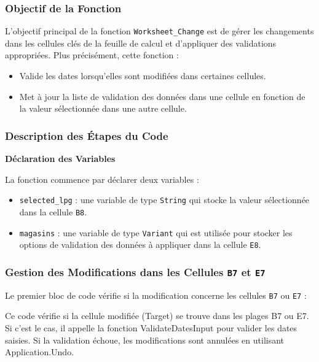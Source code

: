 \documentclass[a4paper, oneside, 12pt, final]{extreport}
\begin{document}
\subsubsection{Objectif de la Fonction}

L'objectif principal de la fonction \texttt{Worksheet\_Change} est de gérer les changements dans les cellules clés de la feuille de calcul et d'appliquer des validations appropriées. Plus précisément, cette fonction :

\begin{itemize}
    \item Valide les dates lorsqu'elles sont modifiées dans certaines cellules.
    \item Met à jour la liste de validation des données dans une cellule en fonction de la valeur sélectionnée dans une autre cellule.
\end{itemize}

\subsubsection{Description des Étapes du Code}

\textbf{Déclaration des Variables}

La fonction commence par déclarer deux variables :

\begin{itemize}
    \item \texttt{selected\_lpg} : une variable de type \texttt{String} qui stocke la valeur sélectionnée dans la cellule \texttt{B8}.
    \item \texttt{magasins} : une variable de type \texttt{Variant} qui est utilisée pour stocker les options de validation des données à appliquer dans la cellule \texttt{E8}.
\end{itemize}

\subsubsection{Gestion des Modifications dans les Cellules \texttt{B7} et \texttt{E7}}

Le premier bloc de code vérifie si la modification concerne les cellules \texttt{B7} ou \texttt{E7} :

Ce code vérifie si la cellule modifiée (Target) se trouve dans les plages B7 ou E7. Si c'est le cas, il appelle la fonction ValidateDatesInput pour valider les dates saisies. Si la validation échoue, les modifications sont annulées en utilisant Application.Undo.
\end{document}
